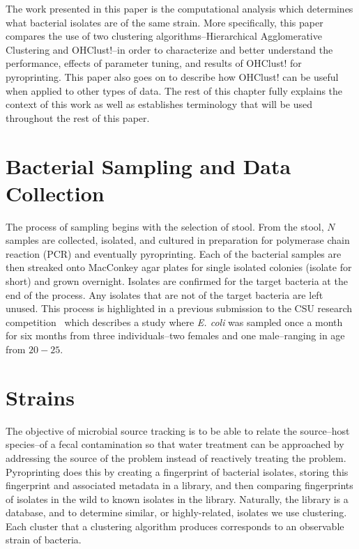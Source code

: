 \documentclass[12pt]{ucthesis}
\begin{document}
   The work presented in this paper is the computational analysis which
   determines what bacterial isolates are of the same strain. More
   specifically, this paper compares the use of two clustering
   algorithms--Hierarchical Agglomerative Clustering and OHClust!--in order to
   characterize and better understand the performance, effects of parameter
   tuning, and results of OHClust! for pyroprinting. This paper also goes on to
   describe how OHClust! can be useful when applied to other types of data. The
   rest of this chapter fully explains the context of this work as well as
   establishes terminology that will be used throughout the rest of this
   paper.

   \section{Bacterial Sampling and Data Collection}\label{sec:sampling}
      The process of sampling begins with the selection of stool. From the
      stool, $N$ samples are collected, isolated, and cultured in preparation
      for polymerase chain reaction (PCR) and eventually pyroprinting. Each of
      the bacterial samples are then streaked onto MacConkey agar plates for
      single isolated colonies (isolate for short) and grown overnight.
      Isolates are confirmed for the target bacteria at the end of the process.
      Any isolates that are not of the target bacteria are left unused. This
      process is highlighted in a previous submission to the CSU research
      competition~\cite{Montana:CRC} which describes a study where \textit{E.
      coli} was sampled once a month for six months from three individuals--two
      females and one male--ranging in age from $20-25$.
      
   \section{Strains}\label{sec:strains}
      The objective of microbial source tracking is to be able to relate the
      source--host species--of a fecal contamination so that water treatment
      can be approached by addressing the source of the problem instead of
      reactively treating the problem. Pyroprinting does this by creating
      a fingerprint of bacterial isolates, storing this fingerprint and
      associated metadata in a library, and then comparing fingerprints of
      isolates in the wild to known isolates in the library. Naturally, the
      library is a database, and to determine similar, or highly-related,
      isolates we use clustering. Each cluster that a clustering algorithm
      produces corresponds to an observable strain of bacteria.
\end{document}
